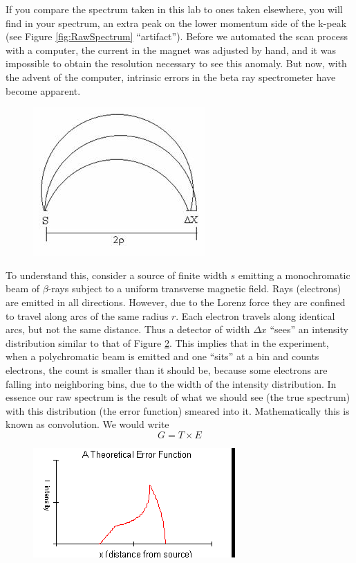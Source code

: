 \documentclass{../lab}
\begin{document}
If you compare the spectrum taken in this lab to ones taken elsewhere, you will find in your spectrum, an extra peak on the lower momentum side of the k-peak (see Figure \ref{fig:RawSpectrum} ``artifact''). Before we automated the scan process with a computer, the current in the magnet was adjusted by hand, and it was impossible to obtain the resolution necessary to see this anomaly. But now, with the advent of the computer, intrinsic errors in the beta ray spectrometer have become apparent.

\begin{figure}[h]
    \centering
    \href{http://experimentationlab.berkeley.edu/sites/default/files/images/BRAimage039.jpg}{\includegraphics[width=0.5\linewidth]{images/BRAimage039.jpg}}
    \caption{}
    \label{fig:BRAimage039}
\end{figure}

To understand this, consider a source of finite width $s$ emitting a monochromatic beam of $\beta$-rays subject to a uniform transverse magnetic field. Rays (electrons) are emitted in all directions. However, due to the Lorenz force they are confined to travel along arcs of the same radius $r$. Each electron travels along identical arcs, but not the same distance. Thus a detector of width $\Delta x$ ``sees'' an intensity distribution similar to that of Figure \ref{fig:TheoreticalErrorFunction}. This implies that in the experiment, when a polychromatic beam is emitted and one ``sits'' at a bin and counts electrons, the count is smaller than it should be, because some electrons are falling into neighboring bins, due to the width of the intensity distribution. In essence our raw spectrum is the result of what we should see (the true spectrum) with this distribution (the error function) smeared into it. Mathematically this is known as convolution. We would write
\[
G = T \times E
\]

\begin{figure}[h]
    \centering
    \href{http://experimentationlab.berkeley.edu/sites/default/files/images/BRAimage040.gif}{\includegraphics[width=0.5\linewidth]{images/BRAimage040.png}}
    \caption{}
    \label{fig:TheoreticalErrorFunction}
\end{figure}
\end{document}
